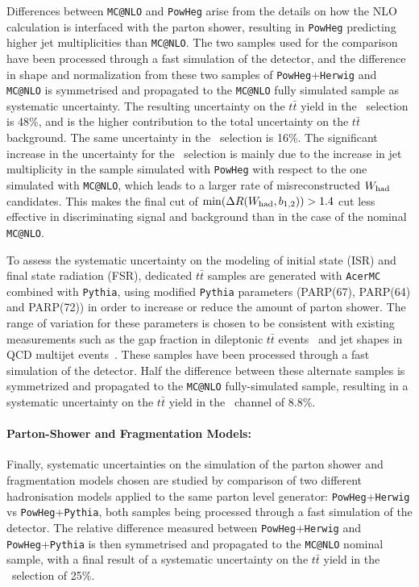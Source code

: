 Differences between \texttt{MC@NLO} and \texttt{PowHeg} arise from 
the details on how the NLO calculation is interfaced with the parton 
shower, resulting in \texttt{PowHeg} predicting higher
jet multiplicities than \texttt{MC@NLO}. The two samples used for the
comparison have been processed through a fast simulation of the detector,
and the difference in shape and normalization from these two samples of
\texttt{PowHeg}+\texttt{Herwig} 
and \texttt{MC@NLO} is symmetrised and propagated to the 
\texttt{MC@NLO} fully simulated sample as systematic uncertainty. 
The resulting uncertainty on the $t\bar{t}$ yield in the \tight\ selection 
is 48\%, and is the higher contribution to the total uncertainty
on the $t\bar{t}$ background. The same uncertainty in the \loose\ selection 
is 16\%. The significant
increase in the uncertainty for the \tight\ selection 
is mainly due to the increase in jet multiplicity in the
sample simulated with \texttt{PowHeg} with respect to the
one simulated with \texttt{MC@NLO}, 
which leads to a larger rate of misreconstructed $W_{\rm had}$ 
candidates. This makes the final cut of 
$\min(\Delta R(W_{\rm had}, b_{1,2}))>1.4$ cut less 
effective in discriminating signal and background than in the 
case of the nominal \texttt{MC@NLO}.

To assess the systematic uncertainty on the modeling of 
initial state (ISR) and final state radiation (FSR), dedicated
$t\bar{t}$ samples are generated with \texttt{AcerMC}
combined with \texttt{Pythia}, using modified \texttt{Pythia} parameters 
(PARP(67), PARP(64) and PARP(72)) 
in order to increase or reduce the amount of parton shower. 
The range of variation for these parameters is chosen to be 
consistent with existing measurements such as the gap fraction in dileptonic 
$t\bar{t}$ events~\cite{ttjet} and jet shapes in QCD multijet events~\cite{morelessPS}.  
These samples have been processed through a fast simulation
of the detector. Half the difference between these alternate samples is symmetrized 
and propagated to the \texttt{MC@NLO} fully-simulated sample, resulting in a
systematic uncertainty on the $t\bar{t}$ yield in the \tight\ channel of 8.8\%.

\paragraph{Parton-Shower and Fragmentation Models:}
Finally, systematic uncertainties on the simulation 
of the parton shower and fragmentation models chosen 
are studied by comparison of two different hadronisation 
models applied to the same parton level generator: 
\texttt{PowHeg}+\texttt{Herwig} vs \texttt{PowHeg}+\texttt{Pythia}, 
both samples being processed through a fast simulation of the detector.
The relative difference measured between 
\texttt{PowHeg}+\texttt{Herwig} and \texttt{PowHeg}+\texttt{Pythia} is 
then symmetrised and propagated to the 
\texttt{MC@NLO} nominal sample, with a final
result of a systematic uncertainty on the 
$t\bar{t}$ yield in the \tight\ selection of 25\%. 

